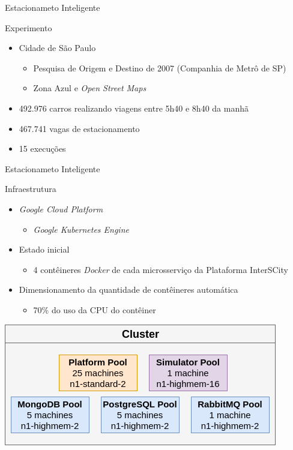 \documentclass[xcolor={usenames,svgnames,dvipsnames},brazil,english,12pt,aspectratio=149]{beamer}
\begin{document}
\begin{frame}{Estacionameto Inteligente}
    \begin{block}{Experimento}
        \begin{itemize}
            \item Cidade de São Paulo
                \begin{itemize}
                    \item Pesquisa de Origem e Destino de 2007 (Companhia de Metrô de SP)
                    \item Zona Azul e \textit{Open Street Maps}
                \end{itemize}
            \item 492.976 carros realizando viagens entre 5h40 e 8h40 da manhã
            \item 467.741 vagas de estacionamento
            \item 15 execuções
        \end{itemize}
    \end{block}
\end{frame}

\begin{frame}{Estacionameto Inteligente}
    \begin{block}{Infraestrutura}
        \begin{itemize}
            \item \textit{Google Cloud Platform}
                \begin{itemize}
                    \item \textit{Google Kubernetes Engine}
                \end{itemize}
            \item Estado inicial
                \begin{itemize}
                    \item 4 contêineres \textit{Docker} de cada microsserviço da Plataforma InterSCity
                \end{itemize}
            \item Dimensionamento da quantidade de contêineres automática
                \begin{itemize}
                    \item 70\% do uso da CPU do contêiner
                \end{itemize}
        \end{itemize}
    \end{block}

    \begin{center}
        \includegraphics[width=.4\textwidth]{node-pools.png}
    \end{center}
\end{frame}
\end{document}
